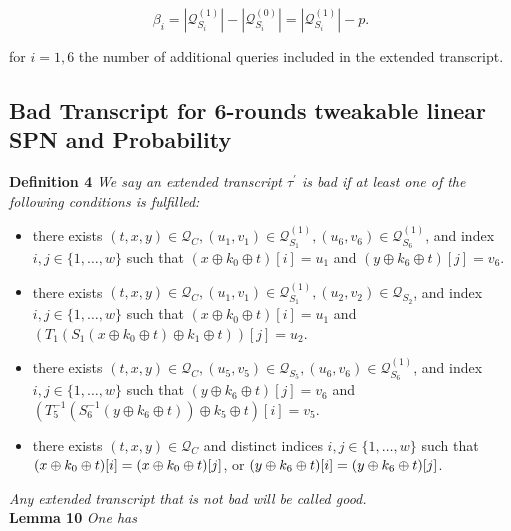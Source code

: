 $$
\beta_{i}=\left|\mathcal{Q}_{S_{i}}^{(1)}\right|-\left|\mathcal{Q}_{S_{i}}^{(0)}\right|=\left|\mathcal{Q}_{S_{i}}^{(1)}\right|-p.
$$

for $i=1, 6$ the number of additional queries included in the extended transcript.\\

\subsection{Bad Transcript for 6-rounds tweakable linear SPN and Probability}

\noindent \textbf{Definition 4} \emph{We say an extended transcript $\tau^{\prime}$ is bad if at least one of the following conditions is fulfilled:}

\begin{itemize}
  \item[\eone]
  there exists $(t, x, y) \in \mathcal{Q}_{C}, \left(u_{1}, v_{1}\right) \in \mathcal{Q}_{S_{1}}^{(1)}, \left(u_{6}, v_{6}\right) \in \mathcal{Q}_{S_{6}}^{(1)}$, and index $i, j \in \{1, \ldots, w\}$ such that $\left(x \oplus k_{0} \oplus t\right)[i]=u_1$ and $\left(y \oplus k_{6} \oplus t\right)[j]=v_6$.
  \item[\etwo]
  there exists $(t, x, y) \in \mathcal{Q}_{C}, \left(u_{1}, v_{1}\right) \in \mathcal{Q}_{S_{1}}^{(1)}, \left(u_{2}, v_{2}\right) \in \mathcal{Q}_{S_{2}}$, and index $i, j \in \{1, \ldots, w\}$ such that $\left(x \oplus k_{0} \oplus t\right)[i]=u_1$ and $\left(T_{1}\left(S_{1}\left(x \oplus k_{0} \oplus t\right) \oplus k_{1} \oplus t\right)\right)[j]=u_2$.
  \item[\ethree]
  there exists $(t, x, y) \in \mathcal{Q}_{C}, \left(u_{5}, v_{5}\right) \in \mathcal{Q}_{S_{5}}, \left(u_{6}, v_{6}\right) \in \mathcal{Q}_{S_{6}}^{(1)}$, and index $i, j \in \{1, \ldots, w\}$ such that $\left(y \oplus k_{6} \oplus t\right)[j]=v_6$ and $\left(T_{5}^{-1}\left(S_{6}^{-1}\left(y \oplus k_{6} \oplus t\right)\right) \oplus k_{5} \oplus t\right)[i]=v_5$.
  \item[\efour]
  there exists $(t, x, y) \in \mathcal{Q}_{C}$ and distinct indices $i, j \in \{1, \ldots, w\}$ such that $(x\oplus k_0 \oplus t)[i]=(x\oplus k_0 \oplus t)[j]$, or $(y\oplus k_6 \oplus t)[i]=(y\oplus k_6 \oplus t)[j]$.
\end{itemize}

\noindent \emph{Any extended transcript that is not bad will be called good. }\\

\noindent \textbf{Lemma 10} \emph{One has}

